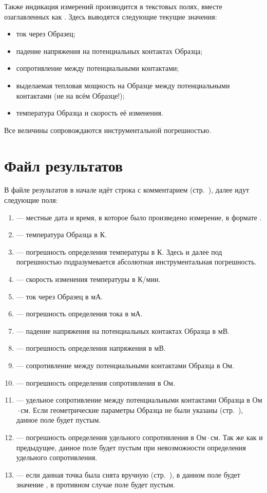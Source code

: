 \documentclass[12pt, a4paper, twocolumn]{report}
\begin{document}
Также индикация измерений производится в текстовых полях, вместе озаглавленных как . Здесь выводятся следующие текущие значения:

\begin{itemize}
\item ток через Образец;
\item падение напряжения на потенциальных контактах Образца;
\item сопротивление между потенциальными контактами;
\item выделаемая тепловая мощность на Образце между потенциальными контактами (не на всём Образце!);
\item температура Образца и скорость её изменения.
\end{itemize}

Все величины сопровождаются инструментальной погрешностью.

\section{Файл результатов}

В файле результатов в начале идёт строка с комментарием (стр.~\pageref{sec_dut_comment}), далее идут следующие поля:

\begin{enumerate}
\item {} --- местные дата и время, в которое было произведено измерение, в формате \mbox{}.
\item {} --- температура Образца в К.
\item \CMD{+/-} --- погрешность определения температуры в К. Здесь и далее под погрешностью подразумевается абсолютная инструментальная погрешность.
\item {} --- скорость изменения температуры в К/мин.
\item {} --- ток через Образец в мА.
\item \CMD{+/-} --- погрешность определения тока в мА.
\item {} --- падение напряжения на потенциальных контактах Образца в мВ.
\item \CMD{+/-} --- погрешность определения напряжения в мВ.
\item {} --- сопротивление между потенциальными контактами Образца в Ом.
\item \CMD{+/-} --- погрешность определения сопротивления в Ом.
\item {} --- удельное сопротивление между потенциальными контактами Образца в Ом${}\cdot{}$см. Если геометрические параметры Образца не были указаны (стр.~\pageref{sec_geom_params}), данное поле будет пустым.
\item \CMD{+/-} --- погрешность определения удельного сопротивления в Ом${}\cdot{}$см. Так же как и предыдущее, данное поле будет пустым при невозможности определения удельного сопротивления.
\item {} --- если данная точка была снята вручную (стр.~\pageref{sec_manual}), в данном поле будет значение , в противном случае поле будет пустым.
\end{enumerate}
\end{document}
